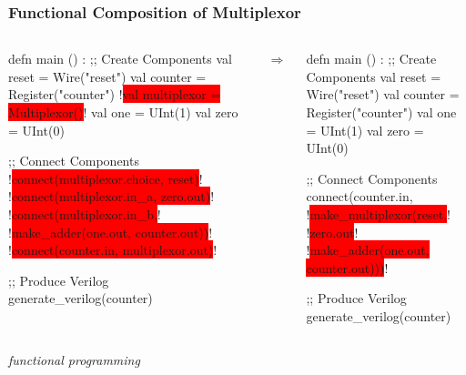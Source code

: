 \documentclass[xcolor=pdflatex,dvipsnames,table]{beamer}
\begin{document}
\begin{frame}[fragile]
\frametitle{Functional Composition of Multiplexor}
\begin{columns}
{
\begin{stanza}
defn main () :
  ;; Create Components
  val reset       = Wire("reset")
  val counter     = Register("counter")
  !\colorbox{red}{val multiplexor = Multiplexor()}!
  val one         = UInt(1)
  val zero        = UInt(0)

  ;; Connect Components
  !\colorbox{red}{connect(multiplexor.choice, reset)}!
  !\colorbox{red}{connect(multiplexor.in\_a, zero.out)}!
  !\colorbox{red}{connect(multiplexor.in\_b,}!
          !\colorbox{red}{make\_adder(one.out, counter.out))}!
  !\colorbox{red}{connect(counter.in, multiplexor.out)}!

  ;; Produce Verilog
  generate_verilog(counter)
\end{stanza}
}
\begin{center}
$\Rightarrow$
\end{center}
{
\begin{stanza}
defn main () :
  ;; Create Components
  val reset   = Wire("reset")
  val counter = Register("counter")
  val one     = UInt(1)
  val zero    = UInt(0)

  ;; Connect Components
  connect(counter.in, 
    !\colorbox{red}{make\_multiplexor(reset,}!
      !\colorbox{red}{zero.out}!
      !\colorbox{red}{make\_adder(one.out, counter.out)))}!

  ;; Produce Verilog
  generate_verilog(counter)
\end{stanza}
}
\end{columns}
\vspace{1cm}
{\it functional programming}
\end{frame}
\end{document}
